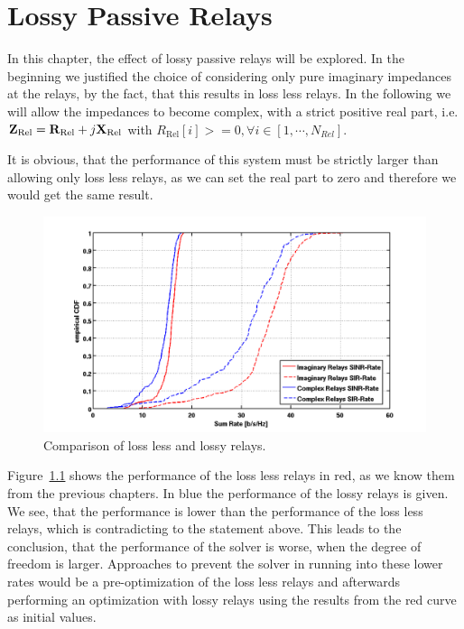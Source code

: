 \chapter{Lossy Passive Relays}
\label{sec:lossyrel}

In this chapter, the effect of lossy passive relays will be explored.
In the beginning we justified the choice of considering only pure imaginary impedances at the relays, by the fact, that this results in loss less relays.
In the following we will allow the impedances to become complex, with a strict positive real part, i.e.
$\mathbf{Z}_\text{Rel} = \mathbf{R}_\text{Rel} + j\mathbf{X}_\text{Rel}$ with $R_\text{Rel}[i]>=0,\forall i\in[1,\cdots,N_{Rel}]$.

It is obvious, that the performance of this system must be strictly larger than allowing only loss less relays, as we can set the real part to zero and therefore we would get the same result.

\begin{figure}[h]
\centering
  \includegraphics[width=\linewidth]{images/Imagvscomp.png}
\caption{Comparison of loss less and lossy relays.}
\label{fig:lossyrel}
\end{figure}

Figure~\ref{fig:lossyrel} shows the performance of the loss less relays in red, as we know them from the previous chapters.
In blue the performance of the lossy relays is given.
We see, that the performance is lower than the performance of the loss less relays, which is contradicting to the statement above.
This leads to the conclusion, that the performance of the solver is worse, when the degree of freedom is larger.
Approaches to prevent the solver in running into these lower rates would be a pre-optimization of the loss less relays and afterwards performing an optimization with lossy relays using the results from the red curve as initial values.



